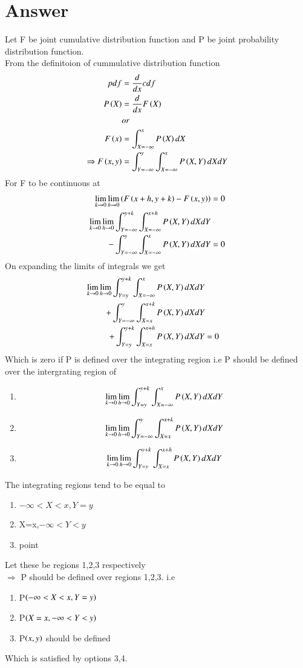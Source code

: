 \documentclass[journal,12pt,twocolumn]{IEEEtran}
\begin{document}
\section{Answer}
Let F be joint cumulative distribution function and P be joint probability distribution function.\\
From the definitoion of cummulative distribution function 
\begin{align}
pdf &= \frac{d}{dx} cdf \nonumber \\
P\left(X\right) &= \frac{d}{dx} F\left(X\right)\nonumber\\
&or\nonumber\\
F\left(x\right) &= \int_{X=-\infty}^x P\left(X\right)dX\\
\Rightarrow F\left(x,y\right) &= \int_{Y=-\infty}^y \int_{X=-\infty}^x P\left(X,Y\right)dXdY
\end{align}
For F to be continuous at \\
\begin{align}
\lim_{k\rightarrow 0}\lim_{h\rightarrow 0} \left(F\left(x+h,y+k\right) - F\left(x,y\right)\right)&=0\\
\lim_{k\rightarrow 0}\lim_{h\rightarrow 0}\int_{Y=-\infty}^{y+k} \int_{X=-\infty}^{x+h} P\left(X,Y\right)dXdY \nonumber\\
-\int_{Y=-\infty}^y \int_{X=-\infty}^x P\left(X,Y\right)dXdY&=0 
\end{align}
On expanding the limits of integrals we get
\begin{align}
\lim_{k\rightarrow 0}\lim_{h\rightarrow 0} \int_{Y=y}^{y+k} \int_{X=-\infty}^x P\left(X,Y\right)dXdY \nonumber \\
+\int_{Y=-\infty}^y \int_{X=x}^{x+k} P\left(X,Y\right)dXdY \nonumber \\
+\int_{Y=y}^{y+k} \int_{X=x}^{x+h} P\left(X,Y\right)dXdY&=0
\end{align}
Which is zero if P is defined over the integrating region i.e P should be defined over the intergrating region of 
\begin{enumerate}
\item \[\lim_{k\rightarrow 0}\lim_{h\rightarrow 0} \int_{Y=y}^{y+k} \int_{X=-\infty}^x P\left(X,Y\right)dXdY\]
\item \[\lim_{k\rightarrow 0}\lim_{h\rightarrow 0} \int_{Y=-\infty}^y \int_{X=x}^{x+k} P\left(X,Y\right)dXdY\]
\item \[\lim_{k\rightarrow 0}\lim_{h\rightarrow 0} \int_{Y=y}^{y+k} \int_{X=x}^{x+h} P\left(X,Y\right)dXdY\]
\end{enumerate}
The integrating regions tend to be equal to 
\begin{enumerate}
\item $-\infty<X<x,Y=y$  
\item X=x,$-\infty<Y<y$ 
\item point  
\end{enumerate}
Let these be regions 1,2,3 respectively\\
$\Rightarrow$ P should be defined over regions 1,2,3. i.e
\begin{enumerate}
\item P$\left(-\infty<X<x,Y=y\right)$  
\item P$\left(X=x,-\infty<Y<y\right)$ 
\item P$\left(x,y\right) $ should be defined
\end{enumerate}
Which is satisfied by options 3,4.
\end{document}
